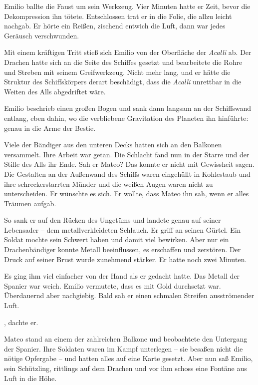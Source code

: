 Emilio ballte die Faust um sein Werkzeug. Vier Minuten hatte er
Zeit, bevor die Dekompression ihn tötete. Entschlossen trat er in
die Folie, die allzu leicht nachgab. Er hörte ein Reißen, zischend
entwich die Luft, dann war jedes Geräusch verschwunden.

Mit einem kräftigen Tritt stieß sich Emilio von der Oberfläche der
\textit{Acalli} ab. Der Drachen hatte sich an die Seite des Schiffes gesetzt
und bearbeitete die Rohre und Streben mit seinem Greifwerkzeug.
Nicht mehr lang, und er hätte die Struktur des Schiffskörpers
derart beschädigt, dass die \textit{Acalli} unrettbar in die Weiten des Alls
abgedriftet wäre.

Emilio beschrieb einen großen Bogen und sank dann langsam an der
Schiffswand entlang, eben dahin, wo die verbliebene Gravitation des
Planeten ihn hinführte: genau in die Arme der Bestie.

Viele der Bändiger aus den unteren Decks hatten sich an den
Balkonen versammelt. Ihre Arbeit war getan. Die Schlacht fand nun
in der Starre und der Stille des Alls ihr Ende. Sah er Mateo? Das
konnte er nicht mit Gewissheit sagen. Die Gestalten an der
Außenwand des Schiffs waren eingehüllt in Kohlestaub und ihre
schreckerstarrten Münder und die weißen Augen waren nicht zu
unterscheiden. Er wünschte es sich. Er wollte, dass Mateo ihn sah,
wenn er alles Träumen aufgab.

So sank er auf den Rücken des Ungetüms und landete genau auf seiner
Lebensader – dem metallverkleideten Schlauch. Er griff an seinen
Gürtel. Ein Soldat mochte sein Schwert haben und damit viel
bewirken. Aber nur ein Drachenbändiger konnte Metall beeinflussen,
es erschaffen und zerstören. Der Druck auf seiner Brust wurde
zunehmend stärker. Er hatte noch zwei Minuten.

Es ging ihm viel einfacher von der Hand als er gedacht hatte. Das
Metall der Spanier war weich. Emilio vermutete, dass es mit Gold
durchsetzt war. Überdauernd aber nachgiebig. Bald sah er einen
schmalen Streifen ausströmender Luft.

, dachte er. 

\tb

Mateo stand an einem der zahlreichen Balkone und beobachtete den
Untergang der Spanier. Ihre Soldaten waren im Kampf unterlegen –
sie besaßen nicht die nötige Opfergabe – und hatten alles auf eine
Karte gesetzt. Aber nun saß Emilio, sein Schützling, rittlings auf
dem Drachen und vor ihm schoss eine Fontäne aus Luft in die Höhe.

